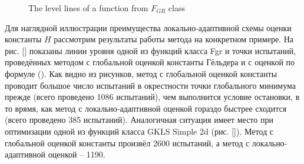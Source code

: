 \begin{figure}[ht]
    \centering
    \qquad
    \caption{The level lines of a function from \(F_{GR}\) class}
    \label{fig:grish_isolines}
\end{figure}

Для наглядной иллюстрации преимущества локально-адаптивной схемы оценки константы
\(H\) рассмотрим результаты работы метода на конкретном примере. На рис. [] показаны
линии уровня одной из функций класса Fgr и точки испытаний, проведённых методом с глобальной
оценкой константы Гёльдера и с оценкой по формуле (). Как видно из рисунков, метод с
глобальной оценкой константы проводит большое число испытаний в окрестности точки
глобального минимума прежде (всего проведено 1086 испытаний), чем выполнится условие
остановки, в то врямя, как метод с локально-адаптивной оценкой гораздо быстрее
сходится (всего проведено 385 испытаний). Аналогичная ситуация имеет место при
оптимизации одной из функций класса GKLS Simple 2d (рис. []). Метод с глобальной
оценкой константы произвёл 2600 испытаний, а метод с локально-адаптивной оценкой – 1190.

